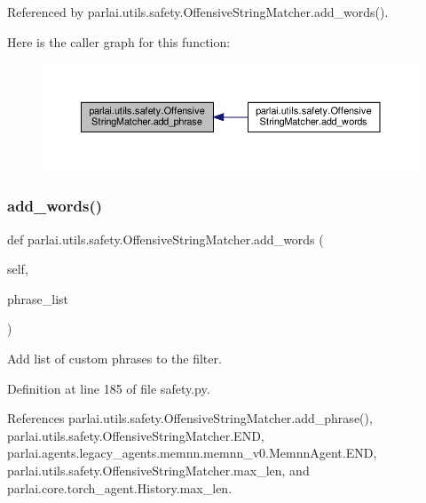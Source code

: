 Referenced by parlai.\+utils.\+safety.\+Offensive\+String\+Matcher.\+add\+\_\+words().

Here is the caller graph for this function\+:
\nopagebreak
\begin{figure}[H]
\begin{center}
\leavevmode
\includegraphics[width=350pt]{classparlai_1_1utils_1_1safety_1_1OffensiveStringMatcher_a9272830360cad4f382c2350dd39b3e6e_icgraph}
\end{center}
\end{figure}
\mbox{\label{classparlai_1_1utils_1_1safety_1_1OffensiveStringMatcher_ab5ca96a02141190f747b03b761f18f98}} 
\subsubsection{\texorpdfstring{add\+\_\+words()}{add\_words()}}
{\footnotesize\ttfamily def parlai.\+utils.\+safety.\+Offensive\+String\+Matcher.\+add\+\_\+words (\begin{DoxyParamCaption}\item[{}]{self,  }\item[{}]{phrase\+\_\+list }\end{DoxyParamCaption})}

\begin{DoxyVerb}Add list of custom phrases to the filter.\end{DoxyVerb}
 

Definition at line 185 of file safety.\+py.



References parlai.\+utils.\+safety.\+Offensive\+String\+Matcher.\+add\+\_\+phrase(), parlai.\+utils.\+safety.\+Offensive\+String\+Matcher.\+E\+ND, parlai.\+agents.\+legacy\+\_\+agents.\+memnn.\+memnn\+\_\+v0.\+Memnn\+Agent.\+E\+ND, parlai.\+utils.\+safety.\+Offensive\+String\+Matcher.\+max\+\_\+len, and parlai.\+core.\+torch\+\_\+agent.\+History.\+max\+\_\+len.

